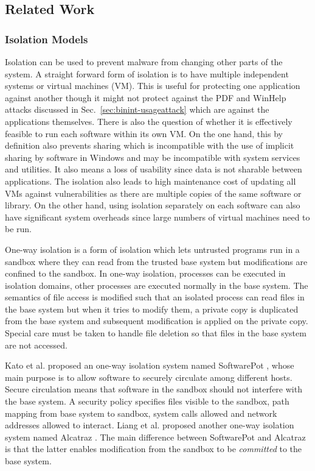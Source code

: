 \subsection{Related Work}
\label{sec:binint-prevworks}


\subsubsection{Isolation Models}

Isolation can be used to prevent malware from changing
other parts of the system.
A straight forward form of isolation is to have 
multiple independent systems or virtual machines (VM).
This is useful for protecting one application against another though
it might not protect against the PDF and WinHelp attacks discussed in
Sec.~\ref{sec:binint-usageattack} which are against the applications themselves.
There is also the question of whether it is effectively feasible to 
run each software within its own VM.
On the one hand,
this by definition also prevents sharing which is incompatible
with the use of implicit sharing by software in Windows and
may be incompatible with system services and utilities.
It also means a loss of usability since data is not sharable
between applications.
The isolation also leads to high
maintenance cost of updating all VMs against
vulnerabilities as there are multiple copies of
the same software or library.
On the other hand, using isolation separately on each software can also
have significant system overheads since large numbers of virtual machines
need to be run.

One-way isolation is a form of isolation which
lets untrusted programs run in a sandbox where they can read from the
trusted base system but modifications are confined to the sandbox.
In one-way isolation, processes can be executed in isolation domains,
other processes are executed normally in the base system.
The semantics of file access is modified such that an isolated process
can read files in the base system but when it tries to modify them,
a private copy is duplicated from the base system and subsequent modification
is applied on the private copy.
Special care must be taken to handle file deletion so that files in the
base system are not accessed.

Kato et al. proposed an one-way isolation system named
SoftwarePot \cite{kato2003softwarepot},
whose main purpose is to allow software to securely circulate among
different hosts.
Secure circulation means that software in the sandbox should not interfere
with the base system.
A security policy specifies files visible to the sandbox,
path mapping from base system to sandbox, system calls allowed and
network addresses allowed to interact.
Liang et al. proposed another one-way isolation system named
Alcatraz \cite{liang2009alcatraz}.
The main difference between SoftwarePot and Alcatraz is that the latter
enables modification from the sandbox to be {\em committed} to the base
system.

